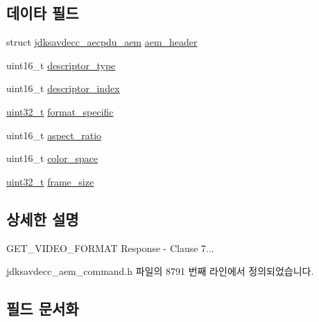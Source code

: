\subsection*{데이타 필드}
\begin{DoxyCompactItemize}
\item 
struct \hyperlink{structjdksavdecc__aecpdu__aem}{jdksavdecc\+\_\+aecpdu\+\_\+aem} \hyperlink{structjdksavdecc__aem__command__get__video__format__response_ae1e77ccb75ff5021ad923221eab38294}{aem\+\_\+header}
\item 
uint16\+\_\+t \hyperlink{structjdksavdecc__aem__command__get__video__format__response_ab7c32b6c7131c13d4ea3b7ee2f09b78d}{descriptor\+\_\+type}
\item 
uint16\+\_\+t \hyperlink{structjdksavdecc__aem__command__get__video__format__response_a042bbc76d835b82d27c1932431ee38d4}{descriptor\+\_\+index}
\item 
\hyperlink{parse_8c_a6eb1e68cc391dd753bc8ce896dbb8315}{uint32\+\_\+t} \hyperlink{structjdksavdecc__aem__command__get__video__format__response_acbfc36b550978f88cf0a3d9d2b2ce0dd}{format\+\_\+specific}
\item 
uint16\+\_\+t \hyperlink{structjdksavdecc__aem__command__get__video__format__response_aa2976b5991e88ce43c451d2683d5f329}{aspect\+\_\+ratio}
\item 
uint16\+\_\+t \hyperlink{structjdksavdecc__aem__command__get__video__format__response_a5f1234a863bb834ff7c110509884d228}{color\+\_\+space}
\item 
\hyperlink{parse_8c_a6eb1e68cc391dd753bc8ce896dbb8315}{uint32\+\_\+t} \hyperlink{structjdksavdecc__aem__command__get__video__format__response_a0229abcfe4414f86dcf52c5ebf84311c}{frame\+\_\+size}
\end{DoxyCompactItemize}


\subsection{상세한 설명}
G\+E\+T\+\_\+\+V\+I\+D\+E\+O\+\_\+\+F\+O\+R\+M\+AT Response -\/ Clause 7... 

jdksavdecc\+\_\+aem\+\_\+command.\+h 파일의 8791 번째 라인에서 정의되었습니다.



\subsection{필드 문서화}

